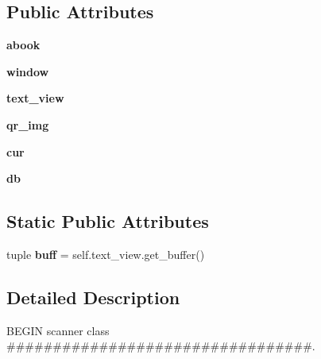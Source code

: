 \subsection*{Public Attributes}
\begin{DoxyCompactItemize}
\item 
\hypertarget{classguiscan_1_1scanner_a3134a254c5a937cdaf7c255dc731be68}{
{\bfseries abook}}
\label{classguiscan_1_1scanner_a3134a254c5a937cdaf7c255dc731be68}

\item 
\hypertarget{classguiscan_1_1scanner_a98cb3e16ca1e49cbc69b05acd7a688d4}{
{\bfseries window}}
\label{classguiscan_1_1scanner_a98cb3e16ca1e49cbc69b05acd7a688d4}

\item 
\hypertarget{classguiscan_1_1scanner_a8ab3328bd34b5be1a953e38cff2f2c36}{
{\bfseries text\_\-view}}
\label{classguiscan_1_1scanner_a8ab3328bd34b5be1a953e38cff2f2c36}

\item 
\hypertarget{classguiscan_1_1scanner_aaf4d4ec0eca657a409d5bfc30c2740aa}{
{\bfseries qr\_\-img}}
\label{classguiscan_1_1scanner_aaf4d4ec0eca657a409d5bfc30c2740aa}

\item 
\hypertarget{classguiscan_1_1scanner_a0c6e5cdc00e82cc84381f4957cfd4026}{
{\bfseries cur}}
\label{classguiscan_1_1scanner_a0c6e5cdc00e82cc84381f4957cfd4026}

\item 
\hypertarget{classguiscan_1_1scanner_a9c21bae12617cad3ca1fde0f3c75fad0}{
{\bfseries db}}
\label{classguiscan_1_1scanner_a9c21bae12617cad3ca1fde0f3c75fad0}

\end{DoxyCompactItemize}
\subsection*{Static Public Attributes}
\begin{DoxyCompactItemize}
\item 
\hypertarget{classguiscan_1_1scanner_a2f502cfc2dc0eba0ad36ba2473be3a40}{
tuple {\bfseries buff} = self.text\_\-view.get\_\-buffer()}
\label{classguiscan_1_1scanner_a2f502cfc2dc0eba0ad36ba2473be3a40}

\end{DoxyCompactItemize}


\subsection{Detailed Description}
BEGIN scanner class \#\#\#\#\#\#\#\#\#\#\#\#\#\#\#\#\#\#\#\#\#\#\#\#\#\#\#\#\#\#\#\#\#. 

